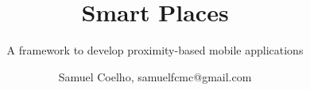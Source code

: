 \documentclass{./llncs2e/llncs}
\begin{document}
\title{Smart Places}

\subtitle{A framework to develop proximity-based mobile applications}
\author{Samuel Coelho, samuelfcmc@gmail.com}

\maketitle

\setcounter{tocdepth}{2}
\makeatletter
\renewcommand*\l@author[2]{}
\renewcommand*\l@title[2]{}
\makeatletter

\tableofcontents

\newpage








\appendix


%
%



\end{document}
